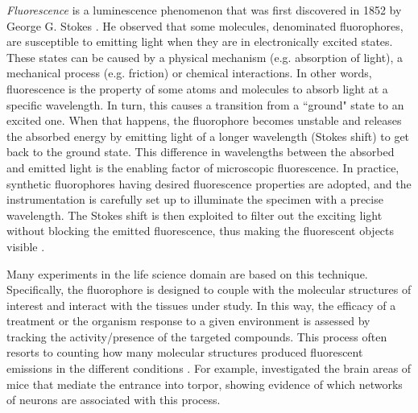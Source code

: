 \emph{Fluorescence} is a luminescence phenomenon that was first discovered in 1852 by George G. Stokes \cite{stokes2010memoir}. 
He observed that some molecules, denominated fluorophores, are susceptible to emitting light when they are in electronically excited states. These states can be caused by a physical mechanism (e.g. absorption of light), a mechanical process (e.g. friction) or chemical interactions.
In other words, fluorescence is the property of some atoms and molecules to absorb light at a specific wavelength. In turn, this causes a transition from a ``ground" state to an excited one. When that happens, the fluorophore becomes unstable and releases the absorbed energy by emitting light of a longer wavelength (Stokes shift) to get back to the ground state.
This difference in wavelengths between the absorbed and emitted light is the enabling factor of microscopic fluorescence. 
In practice, synthetic fluorophores having desired fluorescence properties are adopted, and the 
instrumentation is carefully set up to illuminate the specimen with a precise wavelength. The Stokes shift is then exploited to filter out the exciting light without blocking the emitted fluorescence, thus making the fluorescent objects visible \cite{lichtman2005fluorescence}.

Many experiments in the life science domain are based on this technique.
Specifically, the fluorophore is designed to couple with the molecular structures of interest and interact with the tissues under study. 
In this way, the efficacy of a treatment or the organism response to a given environment is assessed by tracking the activity/presence of the targeted compounds. 
This process often resorts to counting how many molecular structures produced fluorescent emissions in the different conditions \cite{hitrec2019neural, hitrec2021reversible, da2020median}.
For example,  investigated the brain areas of mice that mediate the entrance into torpor, showing evidence of which networks of neurons are associated with this process.

